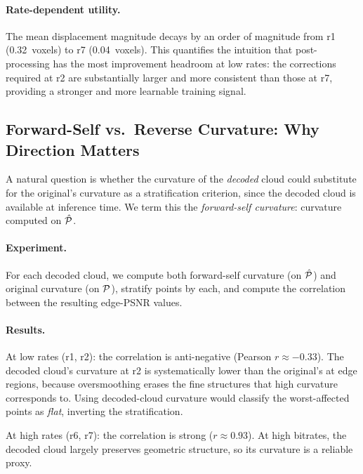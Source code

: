 \paragraph{Rate-dependent utility.}
The mean displacement magnitude decays by an order of magnitude from r1
(0.32~voxels) to r7 (0.04~voxels).
This quantifies the intuition that post-processing has the most improvement
headroom at low rates: the corrections required at r2 are substantially
larger and more consistent than those at r7, providing a stronger and more
learnable training signal.

\subsection{Forward-Self vs.\ Reverse Curvature: Why Direction Matters}

A natural question is whether the curvature of the \emph{decoded} cloud
could substitute for the original's curvature as a stratification criterion,
since the decoded cloud is available at inference time.
We term this the \emph{forward-self curvature}: curvature computed on
$\hat{\mathcal{P}}$.

\paragraph{Experiment.}
For each decoded cloud, we compute both forward-self curvature (on $\hat{\mathcal{P}}$)
and original curvature (on $\mathcal{P}$), stratify points by each, and compute the
correlation between the resulting edge-PSNR values.

\paragraph{Results.}
At low rates (r1, r2): the correlation is anti-negative (Pearson $r \approx -0.33$).
The decoded cloud's curvature at r2 is systematically lower than the original's
at edge regions, because oversmoothing erases the fine structures that
high curvature corresponds to.
Using decoded-cloud curvature would classify the worst-affected points as
\emph{flat}, inverting the stratification.

At high rates (r6, r7): the correlation is strong ($r \approx 0.93$).
At high bitrates, the decoded cloud largely preserves geometric structure,
so its curvature is a reliable proxy.

